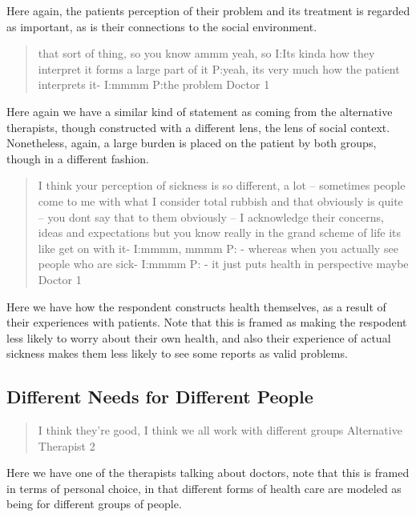 Here again, the patients perception of their problem and its treatment is regarded as important, as is their connections to the social environment. 

\begin{quotation}
  
that sort of thing, so you know ammm yeah, so 
I:Its kinda how they interpret it forms a large part of it
P:yeah, its very much how the patient interprets it-
I:mmmm
P:the problem 
Doctor 1
\end{quotation}

Here again we have a similar kind of statement as coming from the alternative therapists, though constructed with a different lens, the lens of social context. Nonetheless, again, a large burden is placed on the patient by both groups, though in a different fashion. 

\begin{quotation}
  I think your perception of sickness is so different, a lot – sometimes people come to me with what I consider total rubbish and that obviously is quite – you dont say that to them obviously – I acknowledge their concerns, ideas and expectations but you know really in the grand scheme of life its like get on with it-
I:mmmm, mmmm
P: - whereas when you actually see people who are sick-
I:mmmm
P: - it just puts health in perspective maybe 
Doctor 1
\end{quotation}

Here we have how the respondent constructs health themselves, as a result of their experiences with patients. Note that this is framed as making the respodent less likely to worry about their own health, and also their experience of actual sickness makes them less likely to see some reports as valid problems. 


\subsection{Different Needs for Different People}
\label{sec:diff-needs-diff}

\begin{quotation}
  I think  they're good, I think we all work with different groups
Alternative Therapist 2
\end{quotation}

Here we have one of the therapists talking about doctors, note that this is framed in terms of personal choice, in that different forms of health care are modeled as being for different groups of people. 

